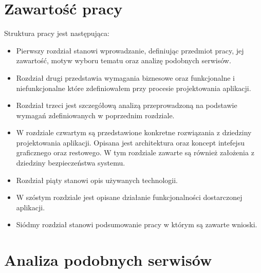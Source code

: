 \section{Zawartość pracy}
\label{sec:zawartoscPracy}
Struktura pracy jest następująca:
\begin{itemize}
\item Pierwszy rozdział stanowi wprowadzanie, definiując przedmiot pracy, jej zawartość,  motyw wyboru tematu oraz analizę podobnych serwisów. 
\item Rozdział drugi przedstawia wymagania biznesowe oraz funkcjonalne i niefunkcjonalne które zdefiniowałem przy procesie projektowania aplikacji. 
\item Rozdział trzeci jest szczegółową analizą przeprowadzoną na podstawie wymagań zdefiniowanych w poprzednim rozdziale. 
\item W rozdziale czwartym są przedstawione konkretne rozwiązania z dziedziny projektowania aplikacji. Opisana jest architektura oraz koncept intefejsu graficznego oraz restowego. W tym rozdziale zawarte są również założenia z dziedziny bezpieczeństwa systemu. 
\item Rozdział piąty stanowi opis używanych technologii. 
\item W szóstym rozdziale jest opisane działanie funkcjonalności dostarczonej aplikacji. 
\item Siódmy rozdział stanowi podsumowanie pracy w którym są zawarte wnioski.
\end{itemize}


\section{Analiza podobnych serwisów}
\label{sec:analizaSerwisow}
